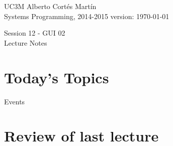 \documentclass[a4paper, 9pt]{extarticle}
\newcommand{\realtitle}{Session 12 - GUI 02}
\begin{document}
\makebox[\linewidth]{\rule{\textwidth}{0.4pt}}
UC3M \hfill Alberto Cortés Martín\\
Systems Programming, 2014-2015 \hfill version: \today\\
\makebox[\linewidth]{\rule{\textwidth}{0.4pt}}
\begin{center}
  \Large{\realtitle}\\Lecture Notes
\end{center}
\makebox[\linewidth]{\rule{\textwidth}{0.4pt}}
\vspace{1cm}


\section{Today's Topics}
\begin{blackboard}
Events
\end{blackboard}


\newpage

\section{Review of last lecture}
\end{document}

